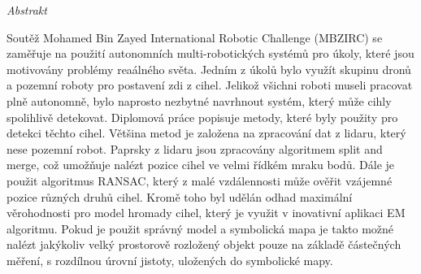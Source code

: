\vfill
\begin{center}
{\it \large Abstrakt}
\vspace{0.2cm}

\begin{minipage}{0.8\textwidth}{
Soutěž Mohamed Bin Zayed International Robotic Challenge (MBZIRC) se zaměřuje na použití autonomních multi-robotických systémů pro úkoly, které jsou motivovány problémy reaálného světa. Jedním z úkolů bylo využít skupinu dronů a pozemní roboty pro postavení zdi z cihel. Jelikož všichni roboti museli pracovat plně autonomně, bylo naprosto nezbytné navrhnout systém, který může cihly spolihlivě detekovat. Diplomová práce popisuje metody, které byly použity pro detekci těchto cihel. Většina metod je založena na zpracování dat z lidaru, který nese pozemní robot. Paprsky z lidaru jsou zpracovány algoritmem split and merge, což umožňuje nalézt pozice cihel ve velmi řídkém mraku bodů. Dále je použit algoritmus RANSAC, který z malé vzdálennosti může ověřit vzájemné pozice různých druhů cihel. Kromě toho byl udělán odhad maximální věrohodnosti pro model hromady cihel, který je využit v inovativní aplikaci EM algoritmu. Pokud je použit správný model a symbolická mapa je takto možné nalézt jakýkoliv velký prostorově rozložený objekt pouze na základě částečných měření, s rozdílnou úrovní jistoty, uložených do symbolické mapy.
}
\end{minipage}
\end{center}
\vfill
\vspace{1cm}
\newpage{}

